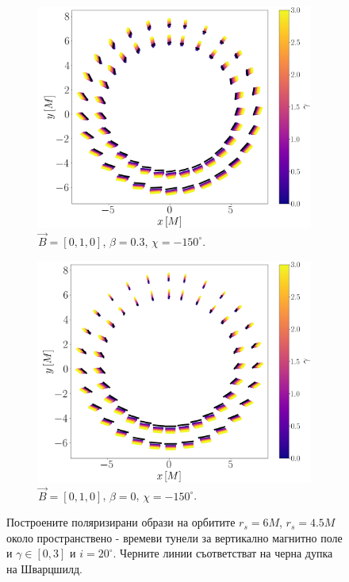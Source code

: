 \begin{figure}[!htb]
	\begin{subfigure}{7cm}
		\hspace{-0.2em}
		\includegraphics[scale = 0.23]{WH_alpha_Vert_Field.png}
		\caption{$\vec{B} = [0, 1, 0]$, $\beta = 0.3$, $\chi = -150^\circ$.} 
	\end{subfigure}\quad\quad
	\begin{subfigure}{7cm}
		\hspace{-0.2em}
		\includegraphics[scale = 0.23]{WH_alpha_Vert_Field_beta_zero.png}
		\caption{$\vec{B} = [0, 1, 0]$, $\beta = 0$, $\chi = -150^\circ$.}
	\end{subfigure}
	\caption[Поляризирани образи около пространствено - времеви тунели за вертикално магнитно поле.]{\small Построените поляризирани образи на орбитите $r_s = 6M$, $r_s = 4.5M$ около пространствено - времеви тунели за вертикално магнитно поле и $\gamma \in[0,3]$ и $i = 20^\circ$. Черните линии съответстват на черна дупка на Шварцшилд.} 
	\label{WH_pol_vert_field}
\end{figure}

